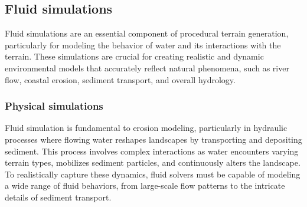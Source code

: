 






\subsection{Fluid simulations}
Fluid simulations are an essential component of procedural terrain generation, particularly for modeling the behavior of water and its interactions with the terrain. These simulations are crucial for creating realistic and dynamic environmental models that accurately reflect natural phenomena, such as river flow, coastal erosion, sediment transport, and overall hydrology.

\subsubsection{Physical simulations}
Fluid simulation is fundamental to erosion modeling, particularly in hydraulic processes where flowing water reshapes landscapes by transporting and depositing sediment. This process involves complex interactions as water encounters varying terrain types, mobilizes sediment particles, and continuously alters the landscape. To realistically capture these dynamics, fluid solvers must be capable of modeling a wide range of fluid behaviors, from large-scale flow patterns to the intricate details of sediment transport.

